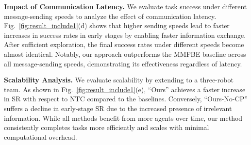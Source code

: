 \textbf{Impact of Communication Latency.} 
We evaluate task success under different message-sending speeds to analyze the effect of communication latency. Fig.~\ref{fig:result_include1}(d) shows that higher sending speeds lead to faster increases in success rates in early stages by enabling faster information exchange. After sufficient exploration, the final success rates under different speeds become almost identical. Notably, our approach outperforms the MMFBE baseline across all message-sending speeds, demonstrating its effectiveness regardless of latency.

\textbf{Scalability Analysis.}
We evaluate scalability by extending to a three-robot team. As shown in Fig.~\ref{fig:result_include1}(e), ``Ours'' achieves a faster increase in SR with respect to NTC compared to the baselines. Conversely, ``Ours-No-CP'' suffers a decline in early-stage SR due to the increased presence of irrelevant information. While all methods benefit from more agents over time, our method consistently completes tasks more efficiently and scales with minimal computational overhead.